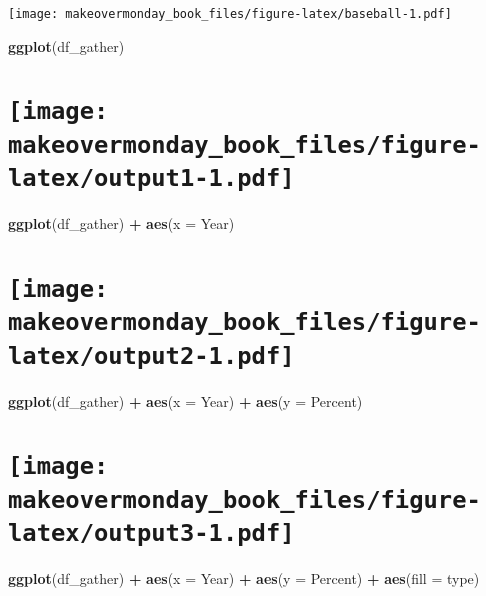 \documentclass[]{book}
\newenvironment{Shaded}{\begin{snugshade}}{\end{snugshade}}
\newcommand{\KeywordTok}[1]{\textcolor[rgb]{0.13,0.29,0.53}{\textbf{#1}}}
\newcommand{\DataTypeTok}[1]{\textcolor[rgb]{0.13,0.29,0.53}{#1}}
\newcommand{\StringTok}[1]{\textcolor[rgb]{0.31,0.60,0.02}{#1}}
\newcommand{\OperatorTok}[1]{\textcolor[rgb]{0.81,0.36,0.00}{\textbf{#1}}}
\newcommand{\NormalTok}[1]{#1}
\theoremstyle{definition}
\theoremstyle{definition}
\theoremstyle{definition}
\theoremstyle{remark}
\begin{document}
\texttt{[image: makeovermonday\_book\_files/figure-latex/baseball-1.pdf]}

\clearpage

\begin{Shaded}
\begin{Highlighting}[]
\KeywordTok{ggplot}\NormalTok{(df_gather) }
\end{Highlighting}
\end{Shaded}

\section[]{\texorpdfstring{\protect\texttt{[image: makeovermonday\_book\_files/figure-latex/output1-1.pdf]}}{}}\label{section}

\clearpage

\begin{Shaded}
\begin{Highlighting}[]
\KeywordTok{ggplot}\NormalTok{(df_gather) }\OperatorTok{+}
\StringTok{  }\KeywordTok{aes}\NormalTok{(}\DataTypeTok{x =}\NormalTok{ Year) }
\end{Highlighting}
\end{Shaded}

\section[]{\texorpdfstring{\protect\texttt{[image: makeovermonday\_book\_files/figure-latex/output2-1.pdf]}}{}}\label{section-1}

\clearpage

\begin{Shaded}
\begin{Highlighting}[]
\KeywordTok{ggplot}\NormalTok{(df_gather) }\OperatorTok{+}
\StringTok{  }\KeywordTok{aes}\NormalTok{(}\DataTypeTok{x =}\NormalTok{ Year) }\OperatorTok{+}
\StringTok{  }\KeywordTok{aes}\NormalTok{(}\DataTypeTok{y =}\NormalTok{ Percent) }
\end{Highlighting}
\end{Shaded}

\section[]{\texorpdfstring{\protect\texttt{[image: makeovermonday\_book\_files/figure-latex/output3-1.pdf]}}{}}\label{section-2}

\clearpage

\begin{Shaded}
\begin{Highlighting}[]
\KeywordTok{ggplot}\NormalTok{(df_gather) }\OperatorTok{+}
\StringTok{  }\KeywordTok{aes}\NormalTok{(}\DataTypeTok{x =}\NormalTok{ Year) }\OperatorTok{+}
\StringTok{  }\KeywordTok{aes}\NormalTok{(}\DataTypeTok{y =}\NormalTok{ Percent) }\OperatorTok{+}
\StringTok{  }\KeywordTok{aes}\NormalTok{(}\DataTypeTok{fill =}\NormalTok{ type) }
\end{Highlighting}
\end{Shaded}
\end{document}
